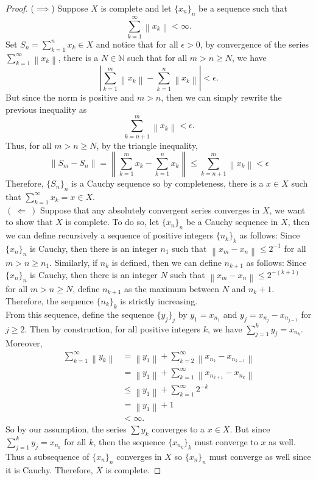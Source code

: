 \documentclass{article}
\newcommand{\N}{\mathbb{N}}
\newcommand{\norm}[1]{\left\lVert#1 \right\rVert}
\newcommand{\abs}[1]{\left\lvert#1 \right\rvert}
\begin{document}
\begin{proof}
    ($\implies$) Suppose $X$ is complete and let $\{x_n\}_n$ be a sequence such that
    $$\sum_{k=1}^{\infty}\norm{x_k} < \infty.$$
    Set $S_n = \sum_{k=1}^{n}x_k \in X$ and notice that for all $\epsilon > 0$, by convergence of the series $\sum_{k=1}^{\infty}\norm{x_k}$, there is a $N \in \N$ such that for all $m > n \geq N$, we have
    $$\abs{\sum_{k=1}^{m}\norm{x_k} - \sum_{k=1}^{n}\norm{x_k}} < \epsilon.$$
    But since the norm is positive and $m > n$, then we can simply rewrite the previous inequality as
    $$\sum_{k=n+1}^{m}\norm{x_k} < \epsilon.$$
    Thus, for all $m > n \geq N$, by the triangle inequality,
    $$\norm{S_m - S_n} = \norm{\sum_{k=1}^{m}x_k - \sum_{k=1}^{n}x_k} \leq \sum_{k=n+1}^{m}\norm{x_k} < \epsilon$$
    Therefore, $\{S_n\}_n$ is a Cauchy sequence so by completeness, there is a $x \in X$ such that $\sum_{k=1}^{\infty}x_k = x \in X$. \\
    $( \ \Longleftarrow \ )$ Suppose that any absolutely convergent series converges in $X$, we want to show that $X$ is complete. To do so, let $\{x_n\}_n$ be a Cauchy sequence in $X$, then we can define recursively a sequence of positive integers $\{n_k\}_k$ as follows: Since $\{x_n\}_n$ is Cauchy, then there is an integer $n_1$ such that $\norm{x_m - x_n} \leq 2^{-1}$ for all $m > n \geq n_1$. Similarly, if $n_k$ is defined, then we can define $n_{k+1}$ as follows: Since $\{x_n\}_n$ is Cauchy, then there is an integer $N$ such that $\norm{x_m - x_n} \leq 2^{-(k+1)}$ for all $m > n \geq N$, define $n_{k+1}$ as the maximum between $N$ and $n_k + 1$. Therefore, the sequence $\{n_k\}_k$ is strictly increasing. \\
    From this sequence, define the sequence $\{y_j\}_j$ by $y_1 = x_{n_1}$ and $y_j = x_{n_j} - x_{n_{j-1}}$ for $j \geq 2$. Then by construction, for all positive integers $k$, we have $\sum_{j=1}^{k}y_j = x_{n_k}$. Moreover,
    \begin{align*}
        \sum_{k=1}^{\infty}\norm{y_k} &= \norm{y_1} + \sum_{k=2}^{\infty}\norm{x_{n_k} - x_{n_{k-1}}} \\
        &= \norm{y_1} + \sum_{k=1}^{\infty}\norm{x_{n_{k+1}} - x_{n_k}} \\
        &\leq \norm{y_1} + \sum_{k=1}^{\infty}2^{-k} \\
        &= \norm{y_1} + 1\\
        &< \infty.
    \end{align*}
    So by our assumption, the series $\sum y_k$ converges to a $x \in X$. But since $\sum_{j=1}^{k}y_j = x_{n_k}$ for all $k$, then the sequence $\{x_{n_k}\}_k$ must converge to $x$ as well. Thus a subsequence of $\{x_n\}_n$ converges in $X$ so $\{x_n\}_n$ must converge as well since it is Cauchy. Therefore, $X$ is complete.
\end{proof}
\end{document}
